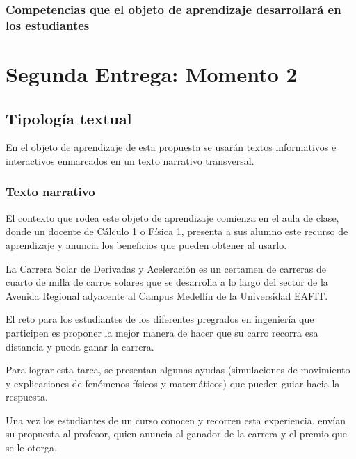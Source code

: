 \documentclass[twoside,letterpaper,11pt]{report}
\begin{document}

\subsection{Competencias que el objeto de aprendizaje desarrollará en los estudiantes } %




\chapter{Segunda Entrega: Momento 2}

\section{Tipología textual}

En el objeto de aprendizaje de esta propuesta se usarán textos informativos e interactivos enmarcados en un texto narrativo transversal.

\subsection{Texto narrativo} %
\label{sub:texto_narrativo}

El contexto que rodea este objeto de aprendizaje comienza en el aula de clase, donde un docente de Cálculo 1 o Física 1, presenta a sus alumno este recurso de aprendizaje y anuncia los beneficios que pueden obtener al usarlo.

La Carrera Solar de Derivadas y Aceleración es un certamen de carreras de cuarto de milla de carros solares que se desarrolla a lo largo del sector de la Avenida Regional adyacente al Campus Medellín de la Universidad EAFIT.

El reto para los estudiantes de los diferentes pregrados en ingeniería que participen es proponer la mejor manera de hacer que su carro recorra esa distancia y pueda ganar la carrera.

Para lograr esta tarea, se presentan algunas ayudas (simulaciones de movimiento y explicaciones de fenómenos físicos y matemáticos) que pueden guiar hacia la respuesta.

Una vez los estudiantes de un curso conocen y recorren esta experiencia, envían su propuesta al profesor, quien anuncia al ganador de la carrera y el premio que se le otorga.
\end{document}
